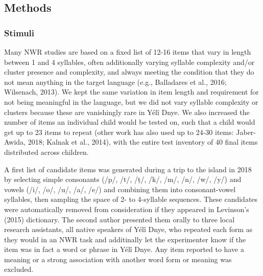 \documentclass[english,,man,floatsintext]{apa6}
\begin{document}
\hypertarget{methods}{%
\subsection{Methods}\label{methods}}

\hypertarget{stimuli}{%
\subsubsection{Stimuli}\label{stimuli}}

Many NWR studies are based on a fixed list of 12-16 items that vary in length between 1 and 4 syllables, often additionally varying syllable complexity and/or cluster presence and complexity, and always meeting the condition that they do not mean anything in the target language (e.g., Balladares et al., 2016; Wilsenach, 2013). We kept the same variation in item length and requirement for not being meaningful in the language, but we did not vary syllable complexity or clusters because these are vanishingly rare in Yélî Dnye. We also increased the number of items an individual child would be tested on, such that a child would get up to 23 items to repeat (other work has also used up to 24-30 items: Jaber-Awida, 2018; Kalnak et al., 2014), with the entire test inventory of 40 final items distributed across children.

A first list of candidate items was generated during a trip to the island in 2018 by selecting simple consonants (/p/, /t/, /ṭ/, /k/, /m/, /n/, /w/, /y/) and vowels (/i/, /o/, /u/, /a/, /e/) and combining them into consonant-vowel syllables, then sampling the space of 2- to 4-syllable sequences. These candidates were automatically removed from consideration if they appeared in Levinson's (2015) dictionary. The second author presented them orally to three local research assistants, all native speakers of Yélî Dnye, who repeated each form as they would in an NWR task and additinally let the experimenter know if the item was in fact a word or phrase in Yélî Dnye. Any item reported to have a meaning or a strong association with another word form or meaning was excluded.
\end{document}
